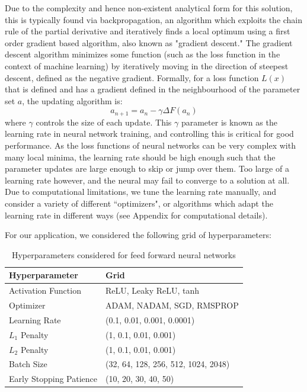 \documentclass{article}
\begin{document}
Due to the complexity and hence non-existent analytical form for this solution, this is typically found via backpropagation, an algorithm which exploits the chain rule of the partial derivative and iteratively finds a local optimum using a first order gradient based algorithm, also known as "gradient descent." The gradient descent algorithm minimizes some function (such as the loss function in the context of machine learning) by iteratively moving in the direction of steepest descent, defined as the negative gradient. Formally, for a loss function $L(x)$ that is defined and has a gradient defined in the neighbourhood of the parameter set $a$, the updating algorithm is:
\begin{equation}
a_{n+1} = a_n - \gamma \Delta F(a_n)
\end{equation}
where $\gamma$ controls the size of each update. This $\gamma$ parameter is known as the learning rate in neural network training, and controlling this is critical for good performance. As the loss functions of neural networks can be very complex with many local minima, the learning rate should be high enough such that the parameter updates are large enough to skip or jump over them. Too large of a learning rate however, and the neural may fail to converge to a solution at all. Due to computational limitations, we tune the learning rate manually, and consider a variety of different ``optimizers", or algorithms which adapt the learning rate in different ways (see Appendix for computational details).

For our application, we considered the following grid of hyperparameters:
\begin{table}[!htb]
	\begin{tabular}{|ll|}
		\hline
		Hyperparameter & Grid \\ \hline
		Activation Function & ReLU, Leaky ReLU, tanh \\
		Optimizer & ADAM, NADAM, SGD, RMSPROP \\
		Learning Rate & (0.1, 0.01, 0.001, 0.0001)\\
		$L_1$ Penalty & (1, 0.1, 0.01, 0.001) \\
		$L_2$ Penalty & (1, 0.1, 0.01, 0.001) \\
		Batch Size & (32, 64, 128, 256, 512, 1024, 2048) \\
		Early Stopping Patience & (10, 20, 30, 40, 50) \\ \hline
	\end{tabular}
	\caption{Hyperparameters considered for feed forward neural networks}
\end{table}
\end{document}
